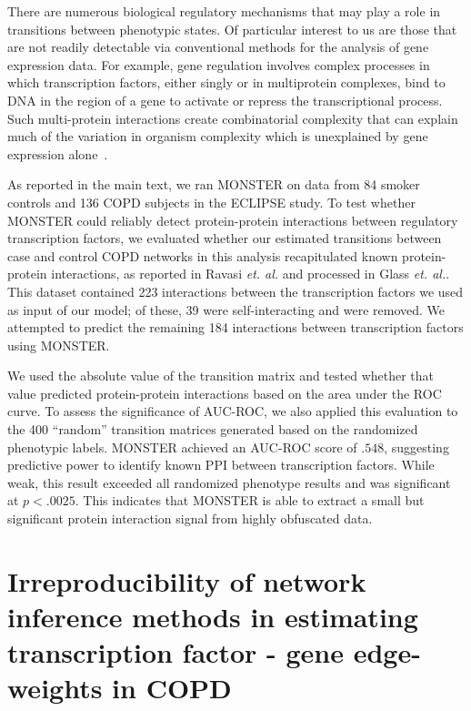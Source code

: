There are numerous biological regulatory mechanisms that may play a role in transitions between phenotypic states. Of particular interest to us are those that are not readily detectable via conventional methods for the analysis of gene expression data. For example, gene regulation involves complex processes in which transcription factors, either singly or in multiprotein complexes, bind to DNA in the region of a gene to activate or repress the transcriptional process. Such multi-protein interactions create combinatorial complexity that can explain much of the variation in organism complexity which is unexplained by gene expression alone~\cite{levine2003transcription}.

As reported in the main text, we ran MONSTER on data from 84 smoker controls and 136 COPD subjects in the ECLIPSE study. To test whether MONSTER could reliably detect protein-protein interactions between regulatory transcription factors, we evaluated whether our estimated transitions between case and control COPD networks in this analysis recapitulated known protein-protein interactions, as reported in Ravasi \emph{et. al.}\cite{ravasi2010atlas} and processed in Glass \emph{et. al.}\cite{glass2015network}. This dataset contained 223 interactions between the transcription factors we used as input of our model; of these, 39 were self-interacting and were removed. We attempted to predict the remaining 184 interactions between transcription factors using MONSTER. 

We used the absolute value of the transition matrix and tested whether that value predicted protein-protein interactions based on the area under the ROC curve. To assess the significance of AUC-ROC, we also applied this evaluation to the 400 ``random'' transition matrices generated based on the randomized phenotypic labels. MONSTER achieved  an AUC-ROC score of $.548$, suggesting predictive power to identify known PPI between transcription factors. While weak, this result exceeded all randomized phenotype results and was significant at $p<.0025$. This indicates that MONSTER is able to extract a small but significant protein interaction signal from highly obfuscated data.

\section*{Irreproducibility of network inference methods in estimating transcription factor - gene edge-weights in COPD}

